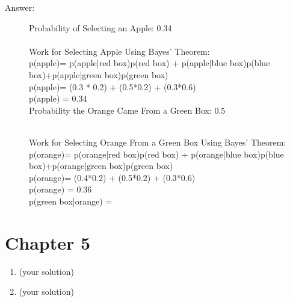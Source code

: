 \documentclass[12pt]{article}
\begin{document}
\begin{enumerate}
\begin{description}
 \item[Answer:] 
Probability of Selecting an Apple: 0.34\\\\
Work for Selecting Apple Using Bayes' Theorem:\\
p(apple)= p(apple|red box)p(red box) + p(apple|blue box)p(blue box)+p(apple|green box)p(green box)\\
p(apple)= (0.3 * 0.2) + (0.5*0.2) + (0.3*0.6)\\
p(apple) = 0.34 \\

Probability the Orange Came From a Green Box: 0.5\\\

Work for Selecting Orange From a Green Box Using Bayes' Theorem:\\
p(orange)= p(orange|red box)p(red box) + p(orange|blue box)p(blue box)+p(orange|green box)p(green box)\\
p(orange)= (0.4*0.2) + (0.5*0.2) + (0.3*0.6)\\
p(orange) = 0.36\\

p(green box|orange) =




\end{description}


\end{enumerate}

\section*{Chapter 5}

\begin{enumerate}
  \item (your solution)
  \item (your solution)
\end{enumerate}
\end{document}
